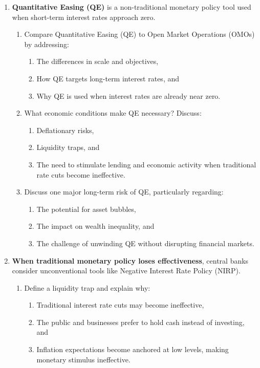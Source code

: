 \begin{enumerate}
    \item \textbf{Quantitative Easing (QE)} is a non-traditional monetary policy tool used when
    short-term interest rates approach zero.

    \begin{enumerate}
        \item Compare Quantitative Easing (QE) to Open Market Operations
        (OMOs) by addressing:
        \begin{enumerate}
            \item The differences in scale and objectives,
            \item How QE targets long-term interest rates, and
            \item Why QE is used when interest rates are already near zero.
        \end{enumerate}

        \item What economic conditions make QE necessary? Discuss:
        \begin{enumerate}
            \item Deflationary risks,
            \item Liquidity traps, and
            \item The need to stimulate lending and economic activity when
            traditional rate cuts become ineffective.
        \end{enumerate}

        \item Discuss one major long-term risk of QE, particularly regarding:
        \begin{enumerate}
            \item The potential for asset bubbles,
            \item The impact on wealth inequality, and
            \item The challenge of unwinding QE without disrupting financial
            markets.
        \end{enumerate}
    \end{enumerate}

    \item \textbf{When traditional monetary policy loses effectiveness}, central banks consider
    unconventional tools like Negative Interest Rate Policy (NIRP).

    \begin{enumerate}
        \item Define a liquidity trap and explain why:
        \begin{enumerate}
            \item Traditional interest rate cuts may become ineffective,
            \item The public and businesses prefer to hold cash instead of
            investing, and
            \item Inflation expectations become anchored at low levels, making
            monetary stimulus ineffective.
        \end{enumerate}


\end{enumerate}
\end{enumerate}
